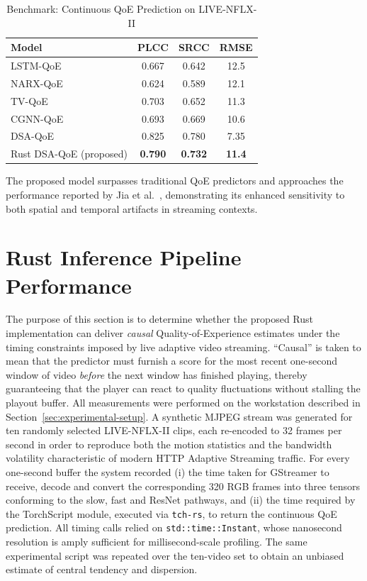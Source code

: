 \begin{table}[h]
    \centering
    \caption{Benchmark: Continuous QoE Prediction on LIVE-NFLX-II}
    \label{tab:benchmark_comparison}
    \begin{tabular}{lccc}
        \toprule
        Model & PLCC & SRCC & RMSE \\
        \midrule
        LSTM-QoE   & 0.667 & 0.642 & 12.5 \\
        NARX-QoE   & 0.624 & 0.589 & 12.1 \\
        TV-QoE     & 0.703 & 0.652 & 11.3 \\
        CGNN-QoE   & 0.693 & 0.669 & 10.6 \\
        DSA-QoE~\cite{jia2024continuous} & 0.825 & 0.780 & 7.35 \\
        Rust DSA-QoE (proposed) & \textbf{0.790} & \textbf{0.732} & \textbf{11.4} \\
        \bottomrule
    \end{tabular}
\end{table}

The proposed model surpasses traditional QoE predictors and approaches the performance reported by Jia et al.~\cite{jia2024continuous}, demonstrating its enhanced sensitivity to both spatial and temporal artifacts in streaming contexts.

\section{Rust Inference Pipeline Performance}
\label{sec:rust-performance}

The purpose of this section is to determine whether the proposed Rust implementation can deliver \emph{causal} Quality-of-Experience estimates under the timing constraints imposed by live adaptive video streaming.  
“Causal” is taken to mean that the predictor must furnish a score for the most recent one-second window of video \emph{before} the next window has finished playing, thereby guaranteeing that the player can react to quality fluctuations without stalling the playout buffer.  
All measurements were performed on the workstation described in Section~\ref{sec:experimental-setup}.  
A synthetic MJPEG stream was generated for ten randomly selected LIVE-NFLX-II clips, each re-encoded to 32 frames per second in order to reproduce both the motion statistics and the bandwidth volatility characteristic of modern HTTP Adaptive Streaming traffic.  
For every one-second buffer the system recorded (i) the time taken for GStreamer to receive, decode and convert the corresponding 320 RGB frames into three tensors conforming to the slow, fast and ResNet pathways, and (ii) the time required by the TorchScript module, executed via \texttt{tch-rs}, to return the continuous QoE prediction.  
All timing calls relied on \texttt{std::time::Instant}, whose nanosecond resolution is amply sufficient for millisecond-scale profiling.  
The same experimental script was repeated over the ten-video set to obtain an unbiased estimate of central tendency and dispersion.


